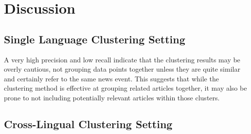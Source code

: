 \section{Discussion}\label{section:discussion}

\subsection{Single Language Clustering Setting}
A very high precision and low recall indicate that the clustering results may be overly cautious, not grouping data points together unless they are quite similar and certainly refer to the same news event. 
This suggests that while the clustering method is effective at grouping related articles together, it may also be prone to not including potentially relevant articles within those clusters.



\subsection{Cross-Lingual Clustering Setting}






